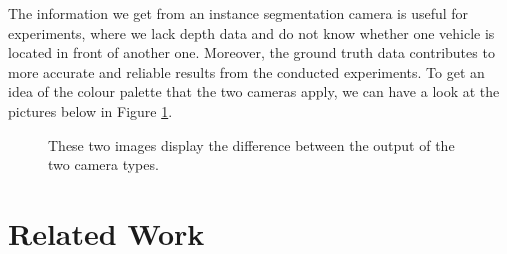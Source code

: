 The information we get from an instance segmentation camera is useful for experiments, where we lack depth data and do not know whether one vehicle is located in front of another one. Moreover, the ground truth data contributes to more accurate and reliable results from the conducted experiments. To get an idea of the colour palette that the two cameras apply, we can have a look at the pictures below in Figure \ref{fig:camera_outputs}. 

\begin{figure} [h]
  \centering
  \hfill
  \caption[CARLA's cameras]{These two images display the difference between the output of the two camera types.} \label{fig:camera_outputs}
\end{figure}
\section{Related Work} \label{related_work}